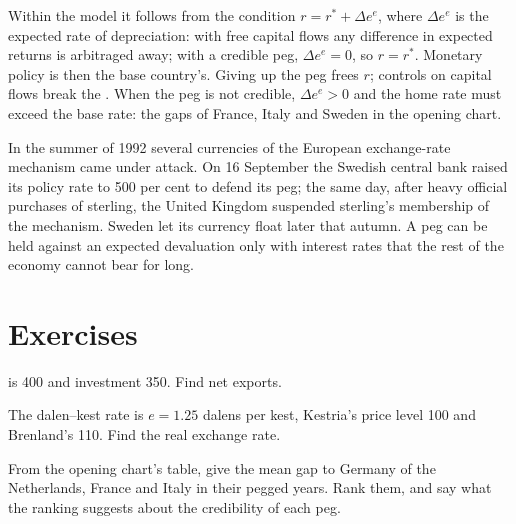Within the model it follows from the condition $r = r^* + \Delta e^e$, where $\Delta e^e$ is the
expected rate of depreciation: with free capital flows any difference in
expected returns is arbitraged away; with a credible peg, $\Delta e^e = 0$, so $r = r^*$.
Monetary policy is then the base country's. Giving up the peg frees $r$;
controls on capital flows break the . When the peg is not
credible, $\Delta e^e > 0$ and the home rate must exceed the base rate: the gaps of
France, Italy and Sweden in the opening chart.

\begin{record}[September 1992]
In the summer of 1992 several currencies of the European exchange-rate
mechanism came under attack. On 16 September the Swedish central bank
raised its policy rate to 500 per cent to defend its peg; %
the same day, after heavy official purchases of sterling, the United
Kingdom suspended sterling's membership of the mechanism. %
Sweden let its currency float later that autumn. A peg can be held against
an expected devaluation only with interest rates that the rest of the
economy cannot bear for long.
\end{record}

\section*{Exercises}\label{sec:b1:open-economy:exercises}

\begin{exercise}[$\star$]\label{exo:b1:open-economy:nx}
 is 400 and investment 350. Find net exports.
\end{exercise}

\begin{exercise}[$\star$]\label{exo:b1:open-economy:real-ex}
The dalen--kest rate is $e = 1.25$ dalens per kest, Kestria's price level 100 and
Brenland's 110. Find the real exchange rate.
\end{exercise}

\begin{exercise}[$\star$]\label{exo:b1:open-economy:read}
From the opening chart's table, give the mean gap to Germany of the
Netherlands, France and Italy in their pegged years. %
Rank them, and say what the ranking suggests about the credibility of
each peg.
\end{exercise}

